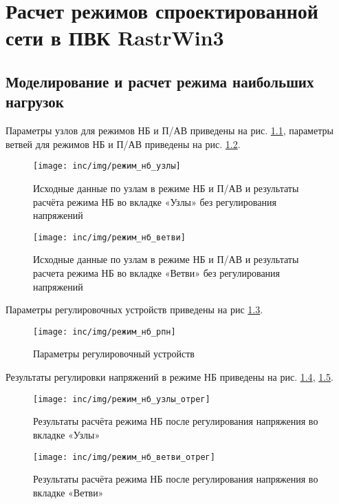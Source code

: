 \chapter{Расчет режимов спроектированной сети в ПВК RastrWin3}
\label{cha:растр_вин}


\section{Моделирование и расчет режима наибольших нагрузок}

Параметры узлов для режимов НБ и П/АВ приведены на рис. \ref{fig:узлы_нб}, параметры ветвей для режимов НБ и П/АВ приведены на рис. \ref{fig:ветви_нб}.

\begin{figure}[H]
	\centering
	\texttt{[image: inc/img/режим\_нб\_узлы]}
	\caption{Исходные данные по узлам в режиме НБ и П/АВ и результаты расчёта режима НБ во вкладке «Узлы» без регулирования напряжений}
	\label{fig:узлы_нб}
\end{figure}

\begin{figure}[H]
	\centering
	\texttt{[image: inc/img/режим\_нб\_ветви]}
	\caption{Исходные данные по узлам в режиме НБ и П/АВ и результаты расчета режима НБ во вкладке «Ветви» без регулирования напряжений}
	\label{fig:ветви_нб}
\end{figure}

Параметры регулировочных устройств приведены на рис \ref{fig:анцапфы}.

\begin{figure}[H]
	\centering
	\texttt{[image: inc/img/режим\_нб\_рпн]}
	\caption{Параметры регулировочный устройств}
	\label{fig:анцапфы}
\end{figure}

Результаты регулировки напряжений в режиме НБ приведены на рис. \ref{fig:узлы_нб_отрег}, \ref{fig:ветви_нб_отрег}.

\begin{figure}[H]
	\centering
	\texttt{[image: inc/img/режим\_нб\_узлы\_отрег]}
	\caption{Результаты расчёта режима НБ после регулирования напряжения во вкладке «Узлы»}
	\label{fig:узлы_нб_отрег}
\end{figure}

\begin{figure}[H]
	\centering
	\texttt{[image: inc/img/режим\_нб\_ветви\_отрег]}
	\caption{Результаты расчёта режима НБ после регулирования напряжения во вкладке «Ветви»}
	\label{fig:ветви_нб_отрег}
\end{figure}

